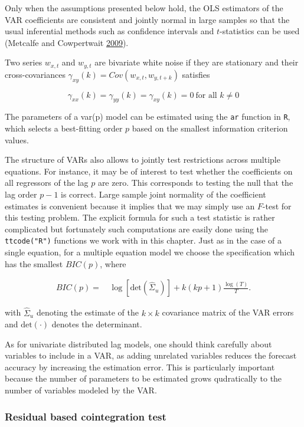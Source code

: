 \documentclass[12pt,]{article}
\begin{document}
Only when the assumptions presented below hold, the OLS estimators of the VAR coefficients are consistent and jointly normal in large samples so that the usual inferential methods such as confidence intervals and \(t\)-statistics can be used (Metcalfe and Cowpertwait \protect\hyperlink{ref-metcalfe2009introductory}{2009}).

Two series \(w_{x,t}\) and \(w_{y,t}\) are bivariate white noise if they are stationary and their cross-covariances \(\gamma_{xy}(k) = Cov(w_{x,t}, w_{y, t+k})\) satisfies

\[
\gamma_{xx}(k) = \gamma_{yy}(k) = \gamma_{xy}(k) = 0\ \text{for all } k \neq 0
\]

The parameters of a var(p) model can be estimated using the \texttt{ar} function in \texttt{R}, which selects a best-fitting order \(p\) based on the smallest information criterion values.

The structure of VARs also allows to jointly test restrictions across multiple equations. For instance, it may be of interest to test whether the coefficients on all regressors of the lag \(p\) are zero. This corresponds to testing the null that the lag order \(p-1\) is correct. Large sample joint normality of the coefficient estimates is convenient because it implies that we may simply use an \(F\)-test for this testing problem. The explicit formula for such a test statistic is rather complicated but fortunately such computations are easily done using the \texttt{ttcode("R")} functions we work with in this chapter. Just as in the case of a single equation, for a multiple equation model we choose the specification which has the smallest \(BIC(p)\), where

\[
\begin{aligned}
  BIC(p) =& \, \log\left[\text{det}(\widehat{\Sigma}_u)\right] + k(kp+1) \frac{\log(T)}{T}.
\end{aligned}
\]

with \(\widehat{\Sigma}_u\) denoting the estimate of the \(k \times k\) covariance matrix of the VAR errors and \(\text{det}(\cdot)\) denotes the determinant.

As for univariate distributed lag models, one should think carefully about variables to include in a VAR, as adding unrelated variables reduces the forecast accuracy by increasing the estimation error. This is particularly important because the number of parameters to be estimated grows qudratically to the number of variables modeled by the VAR.

\hypertarget{residual-based-cointegration-test}{%
\subsubsection{Residual based cointegration test}\label{residual-based-cointegration-test}}
\end{document}
